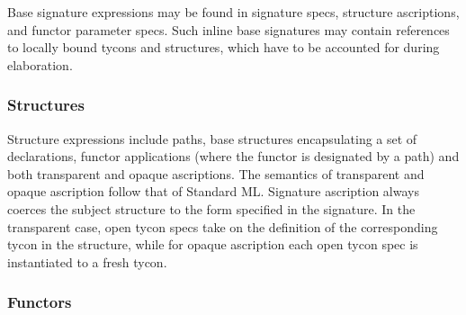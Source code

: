 \documentclass[9pt,nocopyrightspace, fleqn]{sigplanconf}
\begin{document}
Base signature expressions may be found in signature specs, structure
ascriptions, and functor parameter specs.  Such inline base signatures
may contain references to locally bound tycons and structures, which
have to be accounted for during elaboration.

 
\subsubsection{Structures}
Structure expressions include paths, base structures encapsulating a
set of declarations, functor applications (where the functor is
designated by a path) and both transparent and opaque ascriptions. The
semantics of transparent and opaque ascription follow that of Standard
ML. Signature ascription always coerces the subject structure to the
form specified in the signature. In the transparent case, open tycon
specs take on the definition of the corresponding tycon in the
structure, while for opaque ascription each open tycon spec is
instantiated to a fresh tycon.

\subsubsection{Functors}
\end{document}
